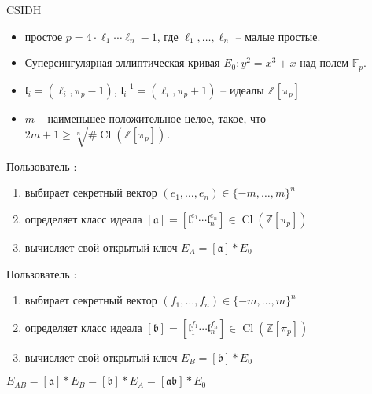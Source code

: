 \documentclass{beamer}
\begin{document}
\begin{frame}{CSIDH}
	\begin{itemize}
		\item простое $p=4\cdot \ell_1 \cdots \ell_n - 1$, где $\ell_1, \ldots, \ell_n$ -- малые простые.
		\item Суперсингулярная эллиптическая кривая $E_0: y^2=x^3+x$ над полем $\mathbb{F}_p$.
		\item $\mathfrak{l}_i=(\ell_i, \pi_p-1)$, $\mathfrak{l}_i^{-1}=(\ell_i, \pi_p+1)$ -- идеалы $\mathbb{Z}[\pi_p]$
		\item $m$ -- наименьшее положительное целое, такое, что $2m+1 \geq \sqrt[n]{\# \operatorname{Cl}(\mathbb{Z}[\pi_p])}$.
	\end{itemize}
\end{frame}

\begin{frame}
	
	\vspace{1em}
	Пользователь \UserA:
	\begin{enumerate}
		\item выбирает секретный вектор $(e_1, \ldots, e_n) \in \lbrace -m,\ldots ,m \rbrace ^n$
		\item определяет класс идеала $[\mathfrak{a}]=[\mathfrak{l}_1^{e_1}\cdots \mathfrak{l}_n^{e_n}]\in \operatorname{Cl}(\mathbb{Z}[\pi_p])$%
		\item вычисляет свой открытый ключ $E_A = [\mathfrak{a}]*E_0$
	\end{enumerate}
	
	\vspace{1em}
	Пользователь \UserB:
	
	\begin{enumerate}
		\item выбирает секретный вектор $(f_1,\ldots ,f_n) \in \lbrace -m,\ldots ,m \rbrace ^n$
		\item определяет класс идеала $[\mathfrak{b}]=[\mathfrak{l}_1^{f_1}\cdots \mathfrak{l}_n^{f_n}]\in \operatorname{Cl}(\mathbb{Z}[\pi_p])$
		\item вычисляет свой открытый ключ $E_B = [\mathfrak{b}]*E_0$
	\end{enumerate}
	
	\vspace{1em}
	 $E_{AB} = [\mathfrak{a}] * E_B = [\mathfrak{b}] * E_A = [\mathfrak{a}\mathfrak{b}] * E_0$
\end{frame}
\end{document}
